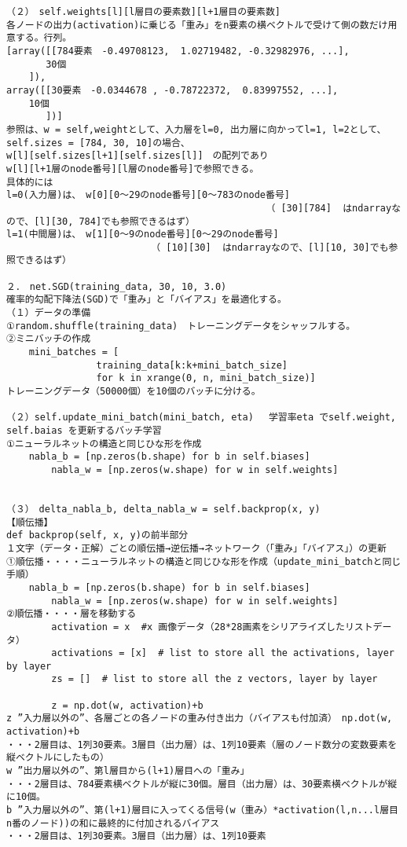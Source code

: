 \documentclass[11pt,a4j,fleqn]{jarticle}
\begin{document}
\begin{verbatim}
（２）　self.weights[l][l層目の要素数][l+1層目の要素数]
各ノードの出力(activation)に乗じる「重み」をn要素の横ベクトルで受けて側の数だけ用意する。行列。
[array([[784要素　-0.49708123,  1.02719482, -0.32982976, ...],
       30個
	]), 
array([[30要素　-0.0344678 , -0.78722372,  0.83997552, ...],
	10個
       ])]
参照は、w = self,weightとして、入力層をl=0, 出力層に向かってl=1, l=2として、 self.sizes = [784, 30, 10]の場合、
w[l][self.sizes[l+1][self.sizes[l]]　の配列であり
w[l][l+1層のnode番号][l層のnode番号]で参照できる。
具体的には
l=0(入力層)は、　w[0][0〜29のnode番号][0〜783のnode番号]
                                          　　　（ [30][784]  はndarrayなので、[l][30, 784]でも参照できるはず）
l=1(中間層)は、　w[1][0〜9のnode番号][0〜29のnode番号]
　　　　　　　　　　　　　　　　（ [10][30]  はndarrayなので、[l][10, 30]でも参照できるはず）

２．　net.SGD(training_data, 30, 10, 3.0)
確率的勾配下降法(SGD)で「重み」と「バイアス」を最適化する。
（１）データの準備
①random.shuffle(training_data)　トレーニングデータをシャッフルする。
②ミニバッチの作成
	mini_batches = [
                training_data[k:k+mini_batch_size]
                for k in xrange(0, n, mini_batch_size)]
トレーニングデータ（50000個）を10個のバッチに分ける。

（２）self.update_mini_batch(mini_batch, eta) 　学習率eta でself.weight, self.baias を更新するバッチ学習
①ニューラルネットの構造と同じひな形を作成
	nabla_b = [np.zeros(b.shape) for b in self.biases]
        nabla_w = [np.zeros(w.shape) for w in self.weights]


（３）　delta_nabla_b, delta_nabla_w = self.backprop(x, y)
【順伝播】
def backprop(self, x, y)の前半部分
１文字（データ・正解）ごとの順伝播→逆伝播→ネットワーク（「重み」「バイアス」）の更新
①順伝播・・・・ニューラルネットの構造と同じひな形を作成（update_mini_batchと同じ手順）
	nabla_b = [np.zeros(b.shape) for b in self.biases]
        nabla_w = [np.zeros(w.shape) for w in self.weights]
②順伝播・・・・層を移動する
        activation = x  #x 画像データ（28*28画素をシリアライズしたリストデータ）
        activations = [x]  # list to store all the activations, layer by layer
        zs = []  # list to store all the z vectors, layer by layer

        z = np.dot(w, activation)+b
z ”入力層以外の”、各層ごとの各ノードの重み付き出力（バイアスも付加済）　np.dot(w, activation)+b
・・・2層目は、1列30要素。3層目（出力層）は、1列10要素（層のノード数分の変数要素を縦ベクトルにしたもの）
w ”出力層以外の”、第l層目から(l+1)層目への「重み」
・・・2層目は、784要素横ベクトルが縦に30個。層目（出力層）は、30要素横ベクトルが縦に10個。
b ”入力層以外の”、第(l+1)層目に入ってくる信号(w（重み）*activation(l,n...l層目n番のノード))の和に最終的に付加されるバイアス
・・・2層目は、1列30要素。3層目（出力層）は、1列10要素


\end{verbatim}
\end{document}
